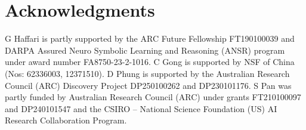 \section*{Acknowledgments}
G Haffari is partly supported by the ARC Future Fellowship FT190100039 and DARPA Assured Neuro Symbolic Learning and Reasoning (ANSR) program under award number FA8750-23-2-1016. C Gong is supported by NSF of China (Nos: 62336003, 12371510). D Phung is supported by the Australian Research Council (ARC) Discovery Project DP250100262 and DP230101176. S Pan was partly funded by Australian Research Council (ARC) under grants FT210100097 and DP240101547 and the CSIRO – National Science Foundation (US) AI Research Collaboration Program. 